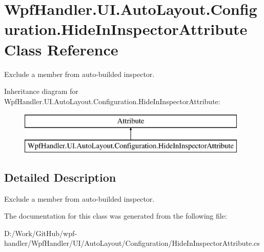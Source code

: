 \hypertarget{class_wpf_handler_1_1_u_i_1_1_auto_layout_1_1_configuration_1_1_hide_in_inspector_attribute}{}\section{Wpf\+Handler.\+U\+I.\+Auto\+Layout.\+Configuration.\+Hide\+In\+Inspector\+Attribute Class Reference}
\label{class_wpf_handler_1_1_u_i_1_1_auto_layout_1_1_configuration_1_1_hide_in_inspector_attribute}


Exclude a member from auto-\/builded inspector.  


Inheritance diagram for Wpf\+Handler.\+U\+I.\+Auto\+Layout.\+Configuration.\+Hide\+In\+Inspector\+Attribute\+:\begin{figure}[H]
\begin{center}
\leavevmode
\includegraphics[height=2.000000cm]{d4/d91/class_wpf_handler_1_1_u_i_1_1_auto_layout_1_1_configuration_1_1_hide_in_inspector_attribute}
\end{center}
\end{figure}


\subsection{Detailed Description}
Exclude a member from auto-\/builded inspector. 



The documentation for this class was generated from the following file\+:\begin{DoxyCompactItemize}
\item 
D\+:/\+Work/\+Git\+Hub/wpf-\/handler/\+Wpf\+Handler/\+U\+I/\+Auto\+Layout/\+Configuration/Hide\+In\+Inspector\+Attribute.\+cs\end{DoxyCompactItemize}
